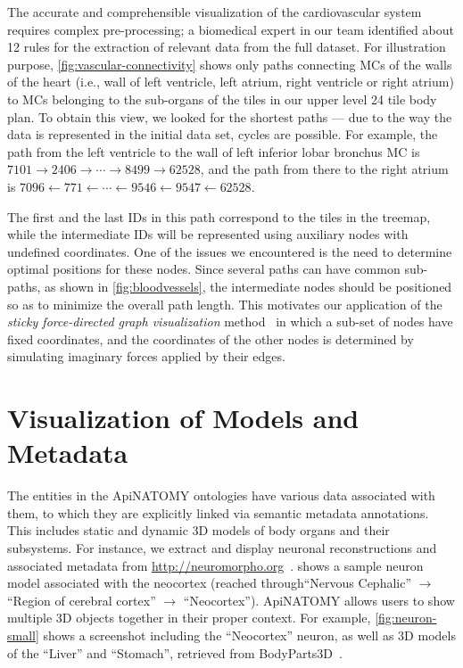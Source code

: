 The accurate and comprehensible visualization of the cardiovascular system requires complex pre-processing; a biomedical expert in our team identified about 12 rules for the extraction of relevant data from the full dataset.
For illustration purpose, \cref{fig:vascular-connectivity} shows only paths connecting MCs of the walls of the heart (i.e., wall of left ventricle, left atrium, right ventricle or right atrium) to MCs belonging to the sub-organs of the tiles in our upper level 24 tile body plan. To obtain this view, we looked for the shortest paths --- due to the way the data is represented in the initial data set, cycles are possible. For example, the path from the left ventricle to the wall of left inferior lobar bronchus MC is
{$7101 \rightarrow 2406 \rightarrow \cdots \rightarrow 8499 \rightarrow 62528$,}
and the path from there to the right atrium is
{$7096 \leftarrow 771 \leftarrow \cdots \leftarrow 9546 \leftarrow 9547 \leftarrow 62528$.}

The first and the last IDs in this path correspond to the tiles in the treemap, while the intermediate IDs will be represented using auxiliary nodes with undefined coordinates. One of the issues we encountered is the need to determine optimal positions for these nodes. Since several paths can have common sub-paths, as shown in \cref{fig:bloodvessels}, the intermediate nodes should be positioned so as to minimize the overall path length. This motivates our application of the \emph{sticky force-directed graph visualization} method~\cite{FR91,Bos14} in which a sub-set of nodes have fixed coordinates, and the coordinates of the other nodes is determined by simulating imaginary forces applied by their edges.


\clearpage %

\section{Visualization of Models and Metadata} \label{sect:visualization2}               %

The entities in the ApiNATOMY ontologies have various data associated with them, to which they are explicitly linked via semantic metadata annotations. This includes static and dynamic 3D models of body organs and their subsystems.
For instance, we extract and display neuronal reconstructions and associated metadata from \url{http://neuromorpho.org}~\cite{Asc06}.
 shows a sample neuron model associated with the neocortex (reached through``Nervous Cephalic'' $\rightarrow$ ``Region of cerebral cortex'' $\rightarrow$ ``Neocortex''). ApiNATOMY allows users to show multiple 3D objects together in their proper context. For example, \cref{fig:neuron-small} shows a screenshot including the ``Neocortex'' neuron, as well as 3D models of the ``Liver'' and ``Stomach'', retrieved from BodyParts3D~\cite{MFT+09}.

